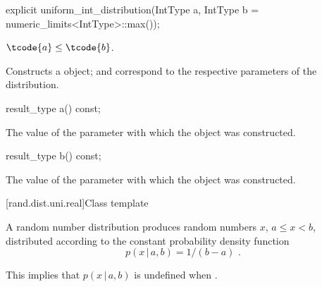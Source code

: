 %
\begin{itemdecl}
explicit uniform_int_distribution(IntType a, IntType b = numeric_limits<IntType>::max());
\end{itemdecl}

\begin{itemdescr}
\pnum\requires
 $\tcode{a} \leq \tcode{b}$.

\pnum\effects Constructs a  object;
  and 
 correspond to the respective parameters of the distribution.
\end{itemdescr}

%
\begin{itemdecl}
result_type a() const;
\end{itemdecl}

\begin{itemdescr}
\pnum\returns The value of the  parameter
 with which the object was constructed.
\end{itemdescr}

%
\begin{itemdecl}
result_type b() const;
\end{itemdecl}

\begin{itemdescr}
\pnum\returns The value of the  parameter
 with which the object was constructed.
\end{itemdescr}


[rand.dist.uni.real]{Class template }%
%
%

\pnum
A  random number distribution
produces random numbers $x$,
$a \leq x < b$,
distributed according to
the constant probability density function%
%
%
\[ p(x\,|\,a,b) = 1 / (b - a) \text{ .} \]
\begin{note}
This implies that $p(x\,|\,a,b)$ is undefined when .
\end{note}

